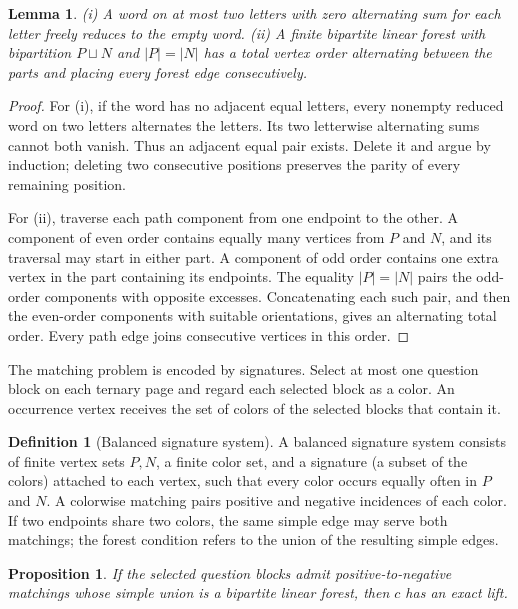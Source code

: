 \documentclass[11pt]{article}
\newtheorem{proposition}[theorem]{Proposition}
\newtheorem{lemma}[theorem]{Lemma}
\theoremstyle{definition}
\newtheorem{definition}[theorem]{Definition}
\theoremstyle{remark}
\newcommand{\card}[1]{\lvert #1\rvert}
\numberwithin{equation}{section}
\begin{document}
\begin{lemma}\label{lem:ordering}
(i) A word on at most two letters with zero alternating sum for each letter
freely reduces to the empty word.
(ii) A finite bipartite linear forest with bipartition \(P\sqcup N\) and
\(\card P=\card N\) has a total vertex order alternating between the parts and placing
every forest edge consecutively.
\end{lemma}

\begin{proof}
For (i), if the word has no adjacent equal letters, every nonempty reduced
word on two letters alternates the letters.  Its two letterwise alternating
sums cannot both vanish.  Thus an adjacent equal pair exists.  Delete it and
argue by induction; deleting two consecutive positions preserves the parity
of every remaining position.

For (ii), traverse each path component from one endpoint to the other.
A component of even order contains equally many vertices from \(P\) and
\(N\), and its traversal may start in either part.  A component of odd order
contains one extra vertex in the part containing its endpoints.  The equality
\(\card P=\card N\) pairs the odd-order components with opposite excesses.
Concatenating each such pair, and then the even-order components with suitable
orientations, gives an alternating total order.  Every path edge joins
consecutive vertices in this order.
\end{proof}

The matching problem is encoded by signatures.  Select at most one question
block on each ternary page and regard each selected block as a color.  An
occurrence vertex receives the set of colors of the selected blocks that
contain it.

\begin{definition}[Balanced signature system]
A balanced signature system consists of finite vertex sets \(P,N\), a finite
color set, and a signature (a subset of the colors) attached to each vertex,
such that every color occurs equally often in \(P\) and \(N\).  A colorwise
matching pairs positive and negative incidences of each color.  If two
endpoints share two colors, the same simple edge may serve both matchings;
the forest condition refers to the union of the resulting simple edges.
\end{definition}

\begin{proposition}\label{prop:selected-block}
If the selected question blocks admit positive-to-negative matchings whose
simple union is a bipartite linear forest, then \(c\) has an exact lift.
\end{proposition}
\end{document}
